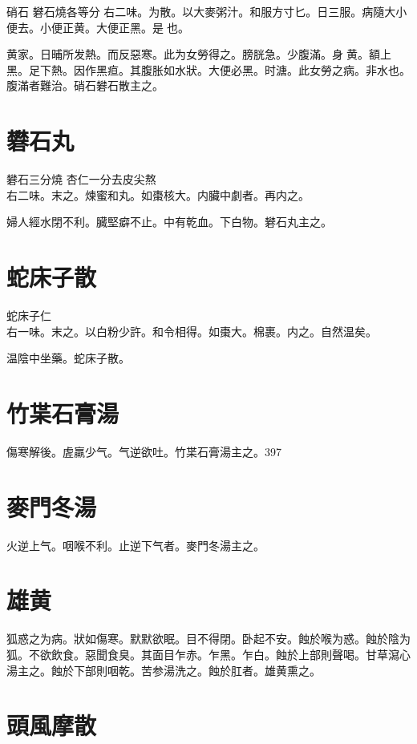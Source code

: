 硝石{ }礬石{\scriptsize 燒各等分} 
右二味。为散。以大麥粥汁。和服方寸匕。日三服。病隨大小便去。小便正黄。大便正黑。是{\sungtpii 𠊱}也。

黄家。日晡所发熱。而反惡寒。此为女勞得之。膀胱急。少腹滿。身{\sungtpii 𥁞}黄。額上黑。足下熱。因作黑疸。其腹胀如水狀。大便必黑。时溏。此女勞之病。非水也。腹滿者難治。硝石礬石散主之。

\section{礬石丸}

礬石{\scriptsize 三分燒} 杏仁{\scriptsize 一分去皮尖熬}\\
右二味。末之。煉蜜和丸。如棗核大。内臟中劇者。再内之。

婦人經水閉不利。臓堅癖不止。中有乾血。下白物。礬石丸主之。

\section{蛇床子散}

蛇床子仁\\
右一味。末之。以白粉少許。和令相得。如棗大。棉裹。内之。自然温矣。

温陰中坐藥。蛇床子散。

\section{竹枼石膏湯}

傷寒解後。虗羸少气。气逆欲吐。竹枼石膏湯主之。397

\section{麥門冬湯}

火逆上气。咽喉不利。止逆下气者。麥門冬湯主之。

\section{雄黄}

狐惑之为病。狀如傷寒。默默欲眠。目不得閉。卧起不安。蝕於喉为惑。蝕於陰为狐。不欲飲食。惡聞食臭。其面目乍赤。乍黑。乍白。蝕於上部則聲喝。甘草瀉心湯主之。蝕於下部則咽乾。苦参湯洗之。蝕於肛者。雄黄熏之。

\section{頭風摩散}

